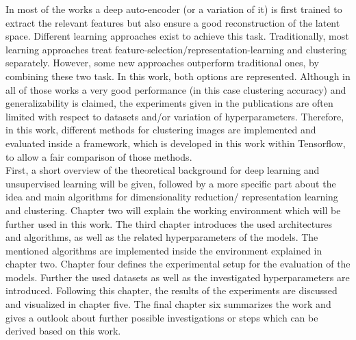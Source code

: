 \documentclass[12pt,DIV14,BCOR12mm,a4paper,footexclude,headinclude,halfparskip-,twoside,openright,cleardoubleempty,idxtotoc,bibtotoc,listtotoc,abstracton]{scrreprt} %
\numberwithin{equation}{chapter}
\begin{document}
In most of the works a deep auto-encoder (or a variation of it) is first trained to extract the relevant features but also ensure a good reconstruction of the latent space. Different learning approaches exist to achieve this task. Traditionally, most learning approaches treat feature-selection/representation-learning and clustering separately. However, some new approaches outperform traditional ones, by combining these two task. In this work, both options are represented. Although in all of those works a very good performance (in this case clustering accuracy) and generalizability is claimed, the experiments given in the publications are often limited with respect to datasets and/or variation of hyperparameters. Therefore, in this work, different methods for clustering images are implemented and evaluated inside a framework, which is developed in this work within Tensorflow, to allow a fair comparison of those methods.\\
First, a short overview of the theoretical background for deep learning and unsupervised learning will be given, followed by a more specific part about the idea and main algorithms for dimensionality reduction/ representation learning and clustering. Chapter two will explain the working environment which will be further used in this work. The third chapter introduces the used architectures and algorithms, as well as the related hyperparameters of the models. The mentioned algorithms are implemented inside the environment explained in chapter two. Chapter four defines the experimental setup for the evaluation of the models. Further the used datasets as well as the investigated hyperparameters are introduced. Following this chapter, the results of the experiments are discussed and visualized in chapter five. The final chapter six summarizes the work and gives a outlook about further possible investigations or steps which can be derived based on this work.
\end{document}
